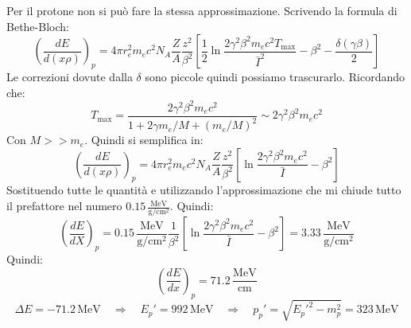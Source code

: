 Per il protone non si può fare la stessa approssimazione. Scrivendo la formula di Bethe-Bloch:
\begin{equation}
     \left(\frac{dE}{d(x\rho)}\right)_p=4 \pi r_e^2 m_e c^2 N_A\frac{Z}{A}\frac{z^2}{\beta^2}\left[\frac{1}{2} \ln \frac{2 \gamma^2 \beta^2 m_e c^2 T_{\max }}{\bar{I}^2}-\beta^2-\frac{\delta(\gamma \beta)}{2}\right] 
\end{equation}
Le correzioni dovute dalla $\delta$ sono piccole quindi possiamo trascurarlo. Ricordando che:
\begin{equation}
    T_\mathrm{max}=\frac{2\gamma^2\beta^2m_ec^2}{1+2\gamma m_e/M+(m_e/M)^2}\sim2\gamma^2\beta^2m_ec^2
\end{equation}
Con $M>>m_e$. Quindi si semplifica in:
\begin{equation}
    \left(\frac{dE}{d(x\rho)}\right)_p=4 \pi r_e^2 m_e c^2 N_A\frac{Z}{A}\frac{z^2}{\beta^2}\left[ \ln \frac{2\gamma^2\beta^2m_ec^2}{\bar{I}}-\beta^2\right]
\end{equation}
Sostituendo tutte le quantità e utilizzando l'approssimazione che mi chiude tutto il prefattore nel numero $0.15\,\frac{\mathrm{MeV}}{\mathrm{g}/\mathrm{cm}^2}$. Quindi:
\begin{equation}
    \left(\frac{dE}{dX}\right)_p=0.15\,\frac{\mathrm{MeV}}{\mathrm{g}/\mathrm{cm}^2}\frac{1}{\beta^2}\left[\ln \frac{2\gamma^2\beta^2m_ec^2}{\bar{I}}-\beta^2\right]=3.33\,\frac{\mathrm{MeV}}{\mathrm{g}/\mathrm{cm}^2}
\end{equation}
Quindi:
\begin{equation}
    \left(\frac{dE}{dx}\right)_p=71.2\,\frac{\mathrm{MeV}}{\mathrm{cm}}
\end{equation}
\begin{equation}
    \Delta E=-71.2\,\mathrm{MeV}\quad \Rightarrow\quad E_p'=992\,\mathrm{MeV} \quad \Rightarrow\quad p_p'=\sqrt{E_p'^2-m_p^2}=323\,\mathrm{MeV}
\end{equation}

